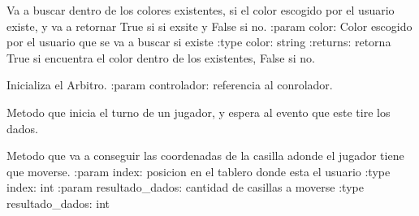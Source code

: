 \documentclass[letterpaper,10pt,english]{sphinxmanual}
\begin{document}
\begin{fulllineitems}
\begin{fulllineitems}
\end{fulllineitems}


\begin{fulllineitems}
\label{\detokenize{codigo:arbitro.Arbitro.existeColor}}
Va a buscar dentro de los colores existentes, si el color escogido por el usuario existe, y va a 
retornar True si si exsite y False si no.
:param color: Color escogido por el usuario que se va a buscar si existe
:type color: string
:returns: retorna True si encuentra el color dentro de los existentes, False si no.

\end{fulllineitems}


\begin{fulllineitems}
\label{\detokenize{codigo:arbitro.Arbitro.init}}
Inicializa el Arbitro.
:param controlador: referencia al conrolador.

\end{fulllineitems}


\begin{fulllineitems}
\label{\detokenize{codigo:arbitro.Arbitro.jugador_juegue}}
Metodo que inicia el turno de un jugador, y espera al evento que este tire los dados.

\end{fulllineitems}


\begin{fulllineitems}
\label{\detokenize{codigo:arbitro.Arbitro.obtener_destino}}
Metodo que va a conseguir las coordenadas de la casilla adonde el jugador tiene
que moverse. 
:param index: posicion en el tablero donde esta el usuario
:type index: int
:param resultado\_dados: cantidad de casillas a moverse
:type resultado\_dados: int


\end{fulllineitems}
\end{fulllineitems}
\end{document}
